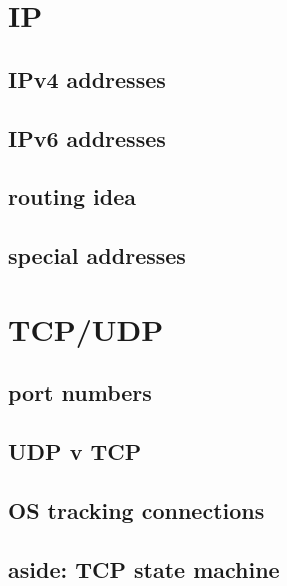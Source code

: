

\section{IP}


\subsection{IPv4 addresses}


\subsection{IPv6 addresses}


\subsection{routing idea}


\subsection{special addresses}


\section{TCP/UDP}

\subsection{port numbers}


\subsection{UDP v TCP}


\subsection{OS tracking connections}


\subsection{aside: TCP state machine}



